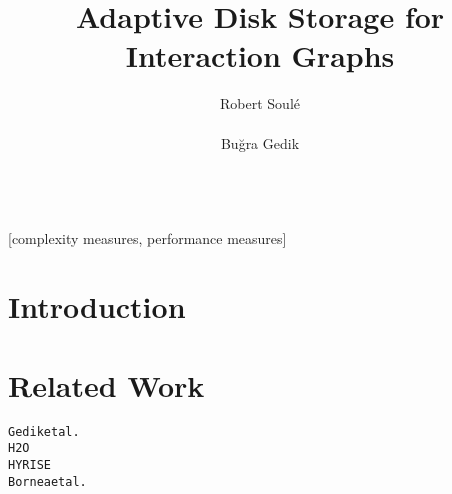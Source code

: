 




%


\title{Adaptive Disk Storage for Interaction Graphs}


\author{
\alignauthor
Robert Soul\'{e}\\
       \\
\alignauthor
Bu\u{g}ra Gedik\\
       \\
}

\maketitle
\begin{abstract}
              
\end{abstract}

[complexity measures, performance measures]



\section{Introduction}

\section{Related Work}

\begin{alltt}\scriptsize
Gedik et al.~\cite{gedik14}
H2O \cite{alagiannis14}
HYRISE~\cite{grund10}
Bornea et al.~\cite{bornea13}
\end{alltt}



  

